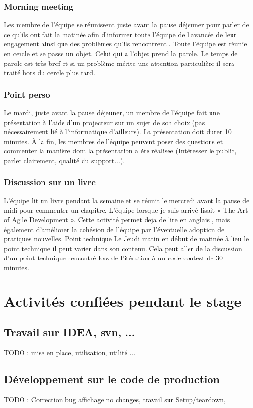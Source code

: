 \documentclass[12pt,oneside]{book}
\begin{document}
\subsubsection{Morning meeting}
Les membre de l'équipe se réunissent juste avant la pause déjeuner pour parler de ce qu'ils ont fait la matinée afin d'informer toute l'équipe de l'avancée de leur engagement ainsi que des problèmes qu'ils rencontrent . Toute l'équipe est réunie en cercle et se passe un objet. Celui qui a l'objet prend la parole. Le temps de parole est très bref et si un problème mérite une attention particulière il sera traité hors du cercle plus tard.

\subsubsection{Point perso}
Le mardi, juste avant la pause déjeuner, un membre de l'équipe fait une présentation à l'aide d'un projecteur sur un sujet de son choix (pas nécessairement lié à l'informatique d'ailleurs). La présentation doit durer 10 minutes. \`A la fin, les membres de l'équipe peuvent poser des questions et commenter la manière dont la présentation a été réalisée (Intéresser le public, parler clairement, qualité du support...).

\subsubsection{Discussion sur un livre}
L'équipe lit un livre pendant la semaine et se réunit le mercredi avant la pause de midi pour commenter un chapitre. L'équipe lorsque je suis arrivé lisait « The Art of Agile Development ». Cette activité permet deja de lire en anglais , mais également d'améliorer la cohésion de l'équipe par l'éventuelle adoption de pratiques nouvelles.
Point technique
Le Jeudi matin en début de matinée à lieu le point technique il peut varier dans son contenu. Cela peut aller de la discussion d'un point technique rencontré lors de l'itération à un code contest de 30 minutes.

\section{Activités confiées pendant le stage}
\subsection{Travail sur IDEA, svn, ...}
TODO : mise en place, utilisation, utilité ...
\subsection{Développement sur le code de production}
TODO : Correction bug affichage no changes, travail sur Setup/teardown, 
\end{document}
